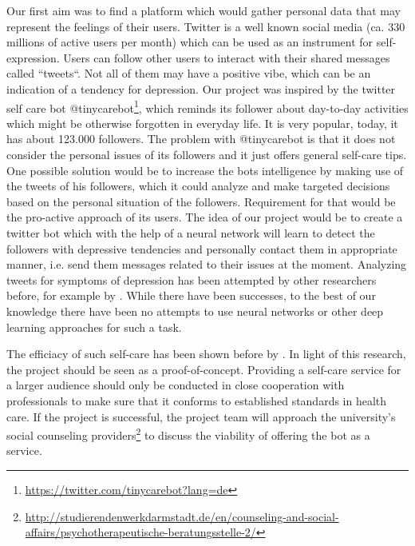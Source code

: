 \documentclass[colorback,accentcolor=tud9c]{tudreport}
\begin{document}
Our first aim was to find a platform which would gather personal data that may represent the feelings of their users. Twitter is a well known social media (ca. 330 millions of active users per month) which can be used as an instrument for self-expression. Users can follow other users to interact with their shared messages called ``tweets``. Not all of them may have a positive vibe, which can be an indication of a tendency for depression. Our project was inspired by the twitter self care bot @tinycarebot\footnote{\href{https://twitter.com/tinycarebot?lang=de}{https://twitter.com/tinycarebot?lang=de}}, which reminds its follower about day-to-day activities which might be otherwise forgotten in everyday life. It is very popular, today, it has about 123.000 followers. The problem with @tinycarebot is that it does not consider the personal issues of its followers and it just offers general self-care tips. One possible solution would be to increase the bots intelligence by making use of the tweets of his followers, which it could analyze and make targeted decisions based on the personal situation of the followers. Requirement for that would be the pro-active approach of its users. The idea of our project would be to create a twitter bot which with the help of a neural network will learn to detect the followers with depressive tendencies and personally contact them in appropriate manner, i.e. send them messages related to their issues at the moment. Analyzing tweets for symptoms of depression has been attempted by other researchers before, for example by \textcite{nadeem_identifying_2016,coppersmith2015clpsych}. While there have been successes, to the best of our knowledge there have been no attempts to use neural networks or other deep learning approaches for such a task.

The efficiacy of such self-care has been shown before by \textcite{levin1976self,berger_internet-based_2011}. In light of this research, the project should be seen as a proof-of-concept. Providing a self-care service for a larger audience should only be conducted in close cooperation with professionals to make sure that it conforms to established standards in health care. If the project is successful, the project team will approach the university's social counseling providers\footnote{\href{http://studierendenwerkdarmstadt.de/en/counseling-and-social-affairs/psychotherapeutische-beratungsstelle-2/}{http://studierendenwerkdarmstadt.de/en/counseling-and-social-affairs/psychotherapeutische-beratungsstelle-2/}} to discuss the viability of offering the bot as a service.
\end{document}
